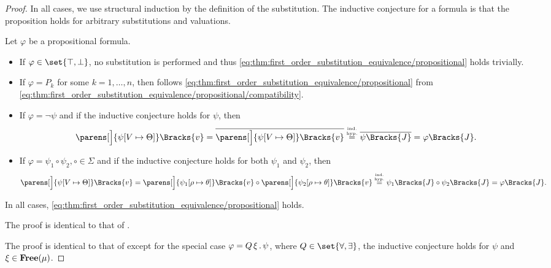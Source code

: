 \begin{proof}
  In all cases, we use structural induction by the definition of the substitution\IND. The inductive conjecture for a formula is that the proposition holds for arbitrary substitutions and valuations.

   Let \( \varphi \) be a propositional formula.
  \begin{itemize}
    \item If \( \varphi \in \set{ \top, \bot } \), no substitution is performed and thus \eqref{eq:thm:first_order_substitution_equivalence/propositional} holds trivially.

    \item If \( \varphi = P_k \) for some \( k = 1, \ldots, n \), then follows \eqref{eq:thm:first_order_substitution_equivalence/propositional} from \eqref{eq:thm:first_order_substitution_equivalence/propositional/compatibility}.

    \item If \( \varphi = \neg \psi \) and if the inductive conjecture holds for \( \psi \), then
    \begin{equation*}
      \parens[\Big]{ \psi[V \mapsto \Theta] }\Bracks{v}
      =
      \overline{\parens[\Big]{ \psi[V \mapsto \Theta] }\Bracks{v}}
      \overset {\IndHyp} =
      \overline{\psi \Bracks{J}}
      =
      \varphi \Bracks{J}.
    \end{equation*}

    \item If \( \varphi = \psi_1 \circ \psi_2, \circ \in \Sigma \) and if the inductive conjecture holds for both \( \psi_1 \) and \( \psi_2 \), then
    \begin{equation*}
      \parens[\Big]{ \psi[V \mapsto \Theta] }\Bracks{v}
      =
      \parens[\Big]{ \psi_1[\rho \mapsto \theta] }\Bracks{v} \circ \parens[\Big]{ \psi_2[\rho \mapsto \theta] }\Bracks{v}
      \overset {\IndHyp} =
      \psi_1 \Bracks{J} \circ \psi_2\Bracks{J}
      =
      \varphi\Bracks{J}.
    \end{equation*}
  \end{itemize}

  In all cases, \eqref{eq:thm:first_order_substitution_equivalence/propositional} holds.

   The proof is identical to that of .

   The proof is identical to that of  except for the special case \( \varphi = Q \, \xi \, . \, \psi \), where \( Q \in \set{ \forall, \exists } \), the inductive conjecture holds for \( \psi \) and \( \xi \in \operatorname{\mathbf{Free}}(\mu) \).


\end{proof}
